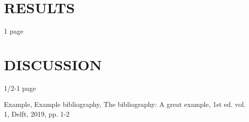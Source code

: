 \documentclass[letterpaper, 10 pt, conference]{ieeeconf}  %
\begin{document}
\section{RESULTS}
1 page

\section{DISCUSSION}
1/2-1 page
 

\addtolength{\textheight}{-12cm}   %










\begin{thebibliography}{99}

 Example, Example bibliography, The bibliography: A great example, 1st ed. vol. 1, Delft, 2019, pp. 1-2


\end{thebibliography}
\end{document}
